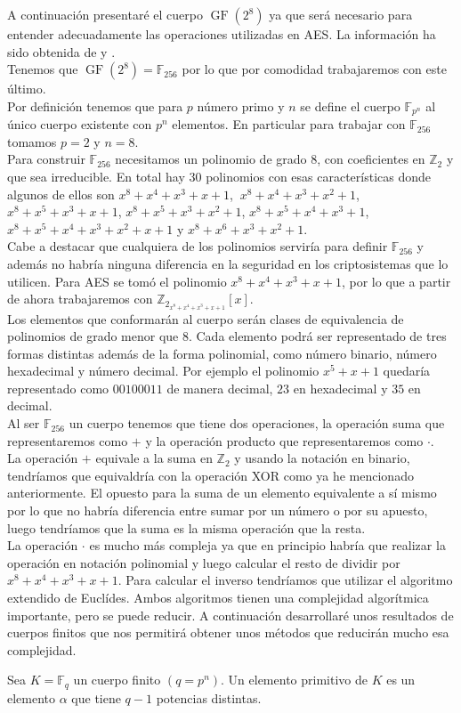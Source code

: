 A continuación presentaré el cuerpo $\operatorname{GF}(2^8)$ ya que será necesario para entender adecuadamente las operaciones utilizadas en AES. La información ha sido obtenida de \cite{criptografia} y \cite{dem1}.\\
Tenemos que $\operatorname{GF}(2^8)=\mathbb{F}_{256}$ por lo que por comodidad trabajaremos con este último.\\
Por definición tenemos que para $p$ número primo y $n$ se define el cuerpo $\mathbb{F}_{p^n}$ al único cuerpo existente con $p^n$ elementos. En particular para trabajar con $\mathbb{F}_{256}$ tomamos $p=2$ y $n=8$.\\
Para construir $\mathbb{F}_{256}$ necesitamos un polinomio de grado 8, con coeficientes en $\mathbb{Z}_2$ y que sea irreducible. En total hay 30 polinomios con esas características donde algunos de ellos son 
$x^8+x^4+x^3+x+1$, $\:x^8+x^4+x^3+x^2+1$, $x^8+x^5+x^3+x+1$, $x^8+x^5+x^3+x^2+1$, $x^8+x^5+x^4+x^3+1$, $x^8+x^5+x^4+x^3+x^2+x+1$ y $x^8+x^6+x^3+x^2+1$.\\ 
Cabe a destacar que cualquiera de los polinomios serviría para definir $\mathbb{F}_{256}$ y además no habría ninguna diferencia en la seguridad en los criptosistemas que lo utilicen. 
Para AES se tomó el polinomio $x^8+x^4+x^3+x+1$, por lo que a partir de ahora trabajaremos con $\mathbb{Z}_{2_{x^8+x^4+x^3+x+1}}[x]$.\\
Los elementos que conformarán al cuerpo serán clases de equivalencia de polinomios  de grado menor que 8. Cada elemento podrá ser representado de tres formas distintas además de la forma polinomial, como número binario, número hexadecimal y número decimal. Por ejemplo el polinomio $x^5+x+1$ quedaría representado como $00100011$ de manera decimal, $23$ en hexadecimal y $35$ en decimal.\\
Al ser $\mathbb{F}_{256}$ un cuerpo tenemos que tiene dos operaciones, la operación suma que representaremos como $+$ y la operación producto que representaremos como $\cdot$.\\
La operación $+$ equivale a la suma en $\mathbb{Z}_2$ y usando la notación en binario, tendríamos que equivaldría con la operación XOR como ya he mencionado anteriormente. El opuesto para la suma de un elemento equivalente a sí mismo por lo que no habría diferencia entre sumar por un número o por su apuesto, luego tendríamos que la suma es la misma operación que la resta.\\
La operación $\cdot$  es mucho más compleja ya que en principio habría que realizar la operación en notación polinomial y luego calcular el resto de dividir por $x^8+x^4+x^3+x+1$. Para calcular el inverso tendríamos que utilizar el algoritmo extendido de Euclídes. Ambos algoritmos tienen una complejidad algorítmica importante, pero se puede reducir. A continuación desarrollaré unos resultados de cuerpos finitos que nos permitirá obtener unos métodos que reducirán mucho esa complejidad.\\
\begin{definicion}
	Sea $K=\mathbb{F}_q$ un cuerpo finito $(q=p^n)$. Un elemento primitivo de $K$ es un elemento $\alpha$ que tiene $q-1$ potencias distintas.
\end{definicion}

